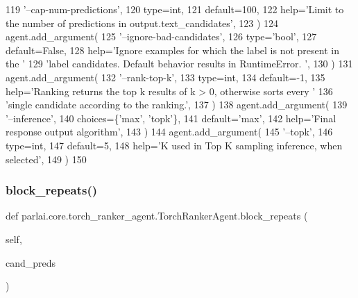 \begin{DoxyCode}
119             \textcolor{stringliteral}{'--cap-num-predictions'},
120             type=int,
121             default=100,
122             help=\textcolor{stringliteral}{'Limit to the number of predictions in output.text\_candidates'},
123         )
124         agent.add\_argument(
125             \textcolor{stringliteral}{'--ignore-bad-candidates'},
126             type=\textcolor{stringliteral}{'bool'},
127             default=\textcolor{keyword}{False},
128             help=\textcolor{stringliteral}{'Ignore examples for which the label is not present in the '}
129             \textcolor{stringliteral}{'label candidates. Default behavior results in RuntimeError. '},
130         )
131         agent.add\_argument(
132             \textcolor{stringliteral}{'--rank-top-k'},
133             type=int,
134             default=-1,
135             help=\textcolor{stringliteral}{'Ranking returns the top k results of k > 0, otherwise sorts every '}
136             \textcolor{stringliteral}{'single candidate according to the ranking.'},
137         )
138         agent.add\_argument(
139             \textcolor{stringliteral}{'--inference'},
140             choices=\{\textcolor{stringliteral}{'max'}, \textcolor{stringliteral}{'topk'}\},
141             default=\textcolor{stringliteral}{'max'},
142             help=\textcolor{stringliteral}{'Final response output algorithm'},
143         )
144         agent.add\_argument(
145             \textcolor{stringliteral}{'--topk'},
146             type=int,
147             default=5,
148             help=\textcolor{stringliteral}{'K used in Top K sampling inference, when selected'},
149         )
150 
\end{DoxyCode}
\mbox{\label{classparlai_1_1core_1_1torch__ranker__agent_1_1TorchRankerAgent_a628050d71339298baafbaf678f94207d}} 
\subsubsection{\texorpdfstring{block\+\_\+repeats()}{block\_repeats()}}
{\footnotesize\ttfamily def parlai.\+core.\+torch\+\_\+ranker\+\_\+agent.\+Torch\+Ranker\+Agent.\+block\+\_\+repeats (\begin{DoxyParamCaption}\item[{}]{self,  }\item[{}]{cand\+\_\+preds }\end{DoxyParamCaption})}

